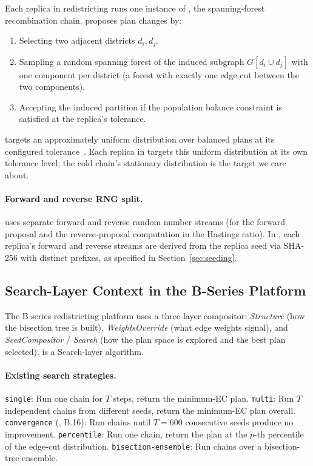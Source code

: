 Each replica in \pt{} redistricting runs one instance of \fr{}
\citep{dellaLibera2026forestRecom}, the spanning-forest recombination chain.
\fr{} proposes plan changes by:
\begin{enumerate}
\item Selecting two adjacent districts $d_i, d_j$.
\item Sampling a random spanning forest of the induced subgraph $G[d_i \cup d_j]$
  with one component per district (a forest with exactly one edge cut between
  the two components).
\item Accepting the induced partition if the population balance constraint is
  satisfied at the replica's tolerance.
\end{enumerate}
\fr{} targets an approximately uniform distribution over balanced plans at its
configured tolerance~\citep{dellaLibera2026forestRecom}.
Each replica in \pt{} targets this uniform distribution at its own tolerance
level; the cold chain's stationary distribution is the target we care about.

\paragraph{Forward and reverse RNG split.}
\fr{} uses separate forward and reverse random number streams (for the forward
proposal and the reverse-proposal computation in the Hastings ratio).
In \pt{}, each replica's forward and reverse streams are derived from the
replica seed via SHA-256 with distinct prefixes, as specified in
Section~\ref{sec:seeding}.

\subsection{Search-Layer Context in the B-Series Platform}

The B-series redistricting platform uses a three-layer compositor:
\emph{Structure} (how the bisection tree is built),
\emph{WeightsOverride} (what edge weights signal),
and \emph{SeedCompositor} / \emph{Search} (how the plan space is explored and
the best plan selected).
\pt{} is a Search-layer algorithm.

\paragraph{Existing search strategies.}
\texttt{single}: Run one \fr{} chain for $T$ steps, return the minimum-EC plan.
\texttt{multi}: Run $T$ independent chains from different seeds, return the
minimum-EC plan overall.
\texttt{convergence} (\cs{}, B.16): Run chains until $T=600$ consecutive seeds
produce no improvement.
\texttt{percentile}: Run one chain, return the plan at the $p$-th percentile
of the edge-cut distribution.
\texttt{bisection-ensemble}: Run chains over a bisection-tree ensemble.


